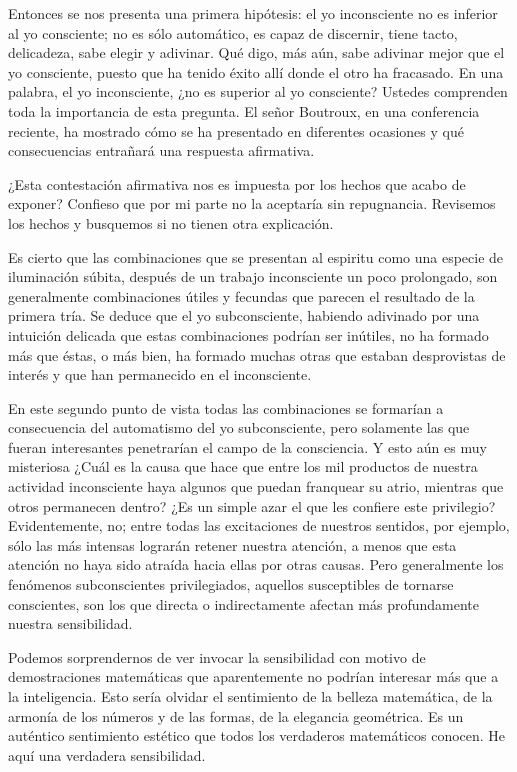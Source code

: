\documentclass[a4paper, 12pt, draft]{article}
\begin{document}
Entonces se nos presenta una primera hipótesis: el yo inconsciente no es
inferior al yo consciente; no es sólo automático, es capaz de
discernir, tiene tacto, delicadeza, sabe elegir y adivinar. Qué digo, más aún, sabe adivinar mejor que el yo consciente, puesto que ha
tenido éxito allí donde el otro ha fracasado. En una palabra, el yo
inconsciente, ¿no es superior al yo consciente? Ustedes comprenden toda la
importancia de esta pregunta. El señor Boutroux, en una conferencia
reciente, ha mostrado cómo se ha presentado en diferentes ocasiones y qué consecuencias entrañará una respuesta afirmativa. 

¿Esta contestación afirmativa nos es impuesta por los hechos que acabo
de exponer? Confieso que por mi parte no la aceptaría sin repugnancia.
Revisemos los hechos y busquemos si no tienen otra explicación.



Es cierto que las combinaciones que se presentan al espiritu como una
especie de iluminación súbita, después de un trabajo
inconsciente un poco prolongado, son generalmente combinaciones útiles y
fecundas que parecen el resultado de la primera tría. Se deduce que el
yo subconsciente, habiendo adivinado por una intuición delicada que
estas combinaciones podrían ser inútiles, no ha formado más que 
éstas, o más bien, ha formado muchas otras que estaban desprovistas
de interés y que han permanecido en el inconsciente.

En este segundo punto de vista todas las combinaciones se formarían a
consecuencia del automatismo del yo subconsciente, pero solamente las que
fueran interesantes penetrarían el campo de la consciencia. Y esto aún es muy misteriosa ¿Cuál es la causa que hace que entre los mil
productos de 
nuestra actividad inconsciente haya algunos que puedan franquear su atrio,
mientras que otros permanecen dentro? ¿Es un simple azar el que les confiere
este privilegio? Evidentemente, no; entre todas las excitaciones de
nuestros sentidos, por ejemplo, sólo las más intensas lograrán
retener nuestra atención, a menos que esta atención no haya sido atraída hacia ellas por otras causas. Pero generalmente los fenómenos
subconscientes privilegiados, aquellos susceptibles de tornarse conscientes,
son los que directa o indirectamente afectan más profundamente nuestra
sensibilidad.

Podemos sorprendernos de ver invocar la sensibilidad con motivo de
demostraciones matemáticas que aparentemente no podrían interesar más que a la inteligencia. Esto sería olvidar el sentimiento de la
belleza matemática, de la armonía de los números y de las
formas, de la elegancia geométrica. Es un auténtico sentimiento estético que todos los verdaderos matemáticos conocen. He aquí una
verdadera sensibilidad.
\end{document}
